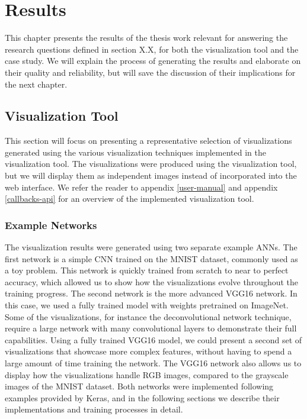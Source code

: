 
\chapter{Results} \label{results-chapter}

This chapter presents the results of the thesis work relevant for answering the research questions defined in section X.X, for both the visualization tool and the case study. We will explain the process of generating the results and elaborate on their quality and reliability, but will save the discussion of their implications for the next chapter.

\section{Visualization Tool}

This section will focus on presenting a representative selection of visualizations generated using the various visualization techniques implemented in the visualization tool. The visualizations were produced using the visualization tool, but we will display them as independent images instead of incorporated into the web interface. We refer the reader to appendix \ref{user-manual} and appendix \ref{callbacks-api} for an overview of the implemented visualization tool.


\subsection{Example Networks}

The visualization results were generated using two separate example ANNs. The first network is a simple CNN trained on the MNIST dataset, commonly used as a toy problem. This network is quickly trained from scratch to near to perfect accuracy, which allowed us to show how the visualizations evolve throughout the training progress. The second network is the more advanced VGG16 network. In this case, we used a fully trained model with weights pretrained on ImageNet. Some of the visualizations, for instance the deconvolutional network technique, require a large network with many convolutional layers to demonstrate their full capabilities. Using a fully trained VGG16 model, we could present a second set of visualizations that showcase more complex features, without having to spend a large amount of time training the network. The VGG16 network also allows us to display how the visualizations handle RGB images, compared to the grayscale images of the MNIST dataset. Both networks were implemented following examples provided by Keras, and in the following sections we describe their implementations and training processes in detail.\\

